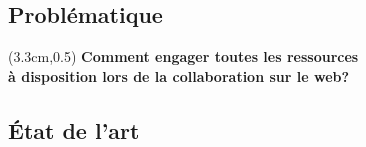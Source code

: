 %
%
%



\subsection{Problématique}

\begin{frame}{}
	\begin{textblock*}{95mm}(3.3cm,0.5\textheight)
		\centering \large
		\textbf{ {\color{Purple}Comment engager toutes les ressources \\ à 
		disposition 
		lors de la collaboration  sur le web?}}
	\end{textblock*}
\end{frame}



\subsection{État de l'art}


\begin{frame}
\centering




\end{frame}


